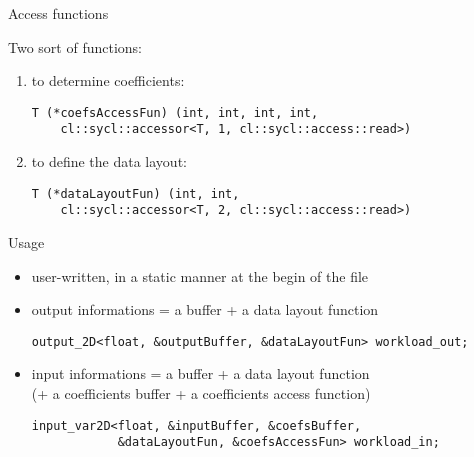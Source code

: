 \documentclass[10pt, compress]{beamer}
\begin{document}
\begin{frame}[fragile]{Access functions}

\begin{block}{Two sort of functions:}
\begin{enumerate}
\item{to determine coefficients:
\begin{verbatim}
T (*coefsAccessFun) (int, int, int, int, 
    cl::sycl::accessor<T, 1, cl::sycl::access::read>)
\end{verbatim}
}
\item{to define the data layout:
\begin{verbatim}
T (*dataLayoutFun) (int, int, 
    cl::sycl::accessor<T, 2, cl::sycl::access::read>)
\end{verbatim}
}

\end{enumerate}
\end{block}

\begin{block}{Usage}
\begin{itemize}
\item user-written, in a static manner at the begin of the file
\item{output informations = a buffer + a data layout function
\begin{verbatim}
output_2D<float, &outputBuffer, &dataLayoutFun> workload_out;
\end{verbatim}
}
\item{input informations = a buffer + a data layout function\\(+ a coefficients buffer + a coefficients access function)
\begin{verbatim}
input_var2D<float, &inputBuffer, &coefsBuffer,
            &dataLayoutFun, &coefsAccessFun> workload_in;
\end{verbatim}
}
\end{itemize}

\end{block}

\end{frame}
\end{document}
